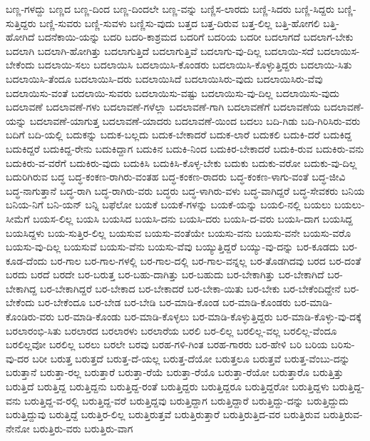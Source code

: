 {ಬಣ್ಣ-ಗಳದ್ದು
ಬಣ್ಣದ
ಬಣ್ಣ-ದಿಂದ
ಬಣ್ಣ-ದಿಂದಲೇ
ಬಣ್ಣ-ವನ್ನು
ಬಣ್ಣಿಸ-ಲಾರದು
ಬಣ್ಣಿ-ಸಿದರು
ಬಣ್ಣಿ-ಸಿದ್ದರು
ಬಣ್ಣಿ-ಸುತ್ತಿದ್ದರು
ಬಣ್ಣಿ-ಸುವರು
ಬಣ್ಣಿ-ಸುವಳು
ಬಣ್ಣಿಸು-ವುದು
ಬತ್ತದ
ಬತ್ತ-ದಿರುವ
ಬತ್ತ-ಲಿಲ್ಲ
ಬತ್ತಿ-ಹೋಗಲಿ
ಬತ್ತಿ-ಹೋಗಿದೆ
ಬದನೆಕಾಯಿ-ಯನ್ನು
ಬದರಿ
ಬದರಿ-ಕಾಶ್ರಮದ
ಬದರಿಗೆ
ಬದರಿಯ
ಬದರೀ
ಬದಲಾಗದೆ
ಬದಲಾಗ-ಬೇಕು
ಬದಲಾಗಿ
ಬದಲಾಗಿ-ಹೋಗಿತ್ತು
ಬದಲಾಗುತ್ತಿದೆ
ಬದಲಾಗುತ್ತಿವೆ
ಬದಲಾಗು-ವು-ದಿಲ್ಲ
ಬದಲಾಯಿ-ಸದೆ
ಬದಲಾಯಿಸ-ಬೇಕೆಂದು
ಬದಲಾಯಿ-ಸಲು
ಬದಲಾಯಿಸಿ
ಬದಲಾಯಿಸಿ-ಕೊಂಡರು
ಬದಲಾಯಿಸಿ-ಕೊಳ್ಳುತ್ತಿದ್ದರು
ಬದಲಾಯಿ-ಸಿತು
ಬದಲಾಯಿಸಿ-ತೆಂದೂ
ಬದಲಾಯಿಸಿ-ದರು
ಬದಲಾಯಿಸಿದೆ
ಬದಲಾಯಿಸಿರು-ವುದು
ಬದಲಾಯಿಸಿರು-ವೆವು
ಬದಲಾಯಿಸು-ವಂತೆ
ಬದಲಾಯಿ-ಸುವರು
ಬದಲಾಯಿಸು-ವಷ್ಟು
ಬದಲಾಯಿಸು-ವು-ದಿಲ್ಲ
ಬದಲಾಯಿಸು-ವುದು
ಬದಲಾವಣೆ
ಬದಲಾವಣೆ-ಗಳು
ಬದಲಾವಣೆ-ಗಳೆಲ್ಲಾ
ಬದಲಾವಣೆ-ಗಾಗಿ
ಬದಲಾವಣೆಗೆ
ಬದಲಾವಣೆಯ
ಬದಲಾವಣೆ-ಯನ್ನು
ಬದಲಾವಣೆ-ಯಾಗುತ್ತ
ಬದಲಾವಣೆ-ಯಾದರು
ಬದಲಾವಣೆ-ಯಿಂದ
ಬದಲು
ಬದಿ-ಗಿಡು
ಬದಿ-ಗಿರಿಸಿರು-ವರು
ಬದಿಗೆ
ಬದಿ-ಯಲ್ಲಿ
ಬದುಕನ್ನು
ಬದುಕ-ಬಲ್ಲದು
ಬದುಕ-ಬೇಕಾದರೆ
ಬದುಕ-ಲಾರೆ
ಬದುಕಲಿ
ಬದುಕಿ-ದರೆ
ಬದುಕಿದ್ದ
ಬದುಕಿದ್ದರೆ
ಬದುಕಿದ್ದ-ರೇನು
ಬದುಕಿದ್ದಾಗ
ಬದುಕಿನ
ಬದುಕಿ-ನಿಂದ
ಬದುಕಿರ-ಬೇಕಾದರೆ
ಬದುಕಿ-ರುವ
ಬದುಕಿರು-ವನು
ಬದುಕಿರು-ವ-ವರೆಗೆ
ಬದುಕಿರು-ವುದು
ಬದುಕಿಸಿ
ಬದುಕಿಸಿ-ಕೊಳ್ಳ-ಬೇಕು
ಬದುಕು
ಬದುಕು-ವರೋ
ಬದುಕು-ವು-ದಿಲ್ಲ
ಬದುರಿಗಿರುವ
ಬದ್ಧ
ಬದ್ಧ-ಕಂಕಣ-ರಾಗಿರು-ವಂತಹ
ಬದ್ಧ-ಕಂಕಣ-ರಾದರು
ಬದ್ಧ-ಕಂಕಣ-ಳಾಗು-ವಂತೆ
ಬದ್ಧ-ಜೀವಿ
ಬದ್ಧ-ನಾಗುತ್ತಾನೆ
ಬದ್ಧ-ರಾಗಿ
ಬದ್ಧ-ರಾಗಿರು-ವರು
ಬದ್ಧರು
ಬದ್ಧ-ಳಾಗಿರು-ವಳು
ಬದ್ಧ-ವಾಗಿದ್ದರೆ
ಬದ್ಧ-ಸೇವಕರು
ಬನಿಯ
ಬನಿಯ-ನಿಗೆ
ಬನಿ-ಯನ್
ಬನ್ನಿ
ಬಫೆಲೋ
ಬಯಕೆ
ಬಯಕೆ-ಗಳನ್ನು
ಬಯಕೆ-ಯನ್ನು
ಬಯಲಿ-ನಲ್ಲಿ
ಬಯಲು
ಬಯಲು-ಸೀಮೆಗೆ
ಬಯಸ-ಲಿಲ್ಲ
ಬಯಸಿ
ಬಯಸಿದ
ಬಯಸಿ-ದನು
ಬಯಸಿ-ದರು
ಬಯಸಿ-ದ-ವರು
ಬಯಸಿ-ದಾಗ
ಬಯಸಿದ್ದ
ಬಯಸಿದ್ದಳು
ಬಯ-ಸುತ್ತಿರ-ಲಿಲ್ಲ
ಬಯಸುವ
ಬಯಸು-ವಂತೆಯೇ
ಬಯಸು-ವನು
ಬಯಸು-ವನೇ
ಬಯಸು-ವರೊ
ಬಯಸು-ವು-ದಿಲ್ಲ
ಬಯಸುವೆ
ಬಯಸು-ವೆನು
ಬಯಸು-ವೆವು
ಬಯ್ಯುತ್ತಿದ್ದರೆ
ಬಯ್ಯು-ವು-ದನ್ನು
ಬರ-ಕೂಡದು
ಬರ-ಕೂಡ-ದೆಂದು
ಬರ-ಗಾಲ
ಬರ-ಗಾಲ-ಗಳಲ್ಲಿ
ಬರ-ಗಾಲ-ದಲ್ಲಿ
ಬರ-ಗಾಲ-ವನ್ನಲ್ಲ
ಬರ-ತೊಡಗಿದವು
ಬರದ
ಬರ-ದಂತೆ
ಬರದು
ಬರದೆ
ಬರದೇ
ಬರ-ಬರುತ್ತ
ಬರ-ಬಹು-ದಾಗಿತ್ತು
ಬರ-ಬಹುದು
ಬರ-ಬೇಕಾಗಿತ್ತು
ಬರ-ಬೇಕಾಗಿದೆ
ಬರ-ಬೇಕಾಗಿದ್ದ
ಬರ-ಬೇಕಾಗಿದ್ದರೆ
ಬರ-ಬೇಕಾದ
ಬರ-ಬೇಕಾದರೆ
ಬರ-ಬೇಕಾ-ಯಿತು
ಬರ-ಬೇಕು
ಬರ-ಬೇಕೆಂದಿದ್ದೇನೆ
ಬರ-ಬೇಕೆಂದು
ಬರ-ಬೇಕೆಂದೂ
ಬರ-ಬೇಡ
ಬರ-ಬೇಡಿ
ಬರ-ಮಾಡಿ-ಕೊಂಡ
ಬರ-ಮಾಡಿ-ಕೊಂಡರು
ಬರ-ಮಾಡಿ-ಕೊಂಡಿರು-ವರು
ಬರ-ಮಾಡಿ-ಕೊಂಡು
ಬರ-ಮಾಡಿ-ಕೊಳ್ಳಲು
ಬರ-ಮಾಡಿ-ಕೊಳ್ಳುತ್ತಿದ್ದರು
ಬರ-ಮಾಡಿ-ಕೊಳ್ಳು-ವು-ದಕ್ಕೆ
ಬರಲಾರಂಭಿ-ಸಿತು
ಬರಲಾರದ
ಬರಲಾರಳು
ಬರಲಾರೆಯ
ಬರಲಿ
ಬರ-ಲಿಲ್ಲ
ಬರಲಿಲ್ಲ-ವಲ್ಲ
ಬರಲಿಲ್ಲ-ವೆಂದೂ
ಬರಲಿಲ್ಲವೋ
ಬರಲಿಲ್ಲ
ಬರಲು
ಬರಲೇ
ಬರವು
ಬರಹ-ಗಳಿ-ಗಿಂತ
ಬರಹ-ಗಾರರು
ಬರ-ಹೇಳಿ
ಬರಿ
ಬರಿಯ
ಬರಿಸು-ವು-ದರ
ಬರೀ
ಬರುತ್ತ
ಬರುತ್ತದೆ
ಬರುತ್ತ-ದೆ-ಯಲ್ಲ
ಬರುತ್ತ-ದೆಯೋ
ಬರುತ್ತಲೂ
ಬರುತ್ತವೆ
ಬರುತ್ತ-ವೆಂಬು-ದನ್ನು
ಬರುತ್ತಾನೆ
ಬರುತ್ತಾ-ರಲ್ಲ
ಬರುತ್ತಾರೆ
ಬರುತ್ತಾ-ರೆಯೆ
ಬರುತ್ತಾ-ರೆಯೊ
ಬರುತ್ತಾ-ರೆಯೋ
ಬರುತ್ತಾರೊ
ಬರುತ್ತಿತ್ತು
ಬರುತ್ತಿದೆ
ಬರುತ್ತಿದ್ದ
ಬರುತ್ತಿದ್ದನು
ಬರುತ್ತಿದ್ದ-ರಂತೆ
ಬರುತ್ತಿದ್ದರು
ಬರುತ್ತಿದ್ದರೂ
ಬರುತ್ತಿದ್ದರೋ
ಬರುತ್ತಿದ್ದಳು
ಬರುತ್ತಿದ್ದ-ವನು
ಬರುತ್ತಿದ್ದ-ವ-ರಲ್ಲಿ
ಬರುತ್ತಿದ್ದ-ವರೆ
ಬರುತ್ತಿದ್ದವು
ಬರುತ್ತಿದ್ದಾಗ
ಬರುತ್ತಿದ್ದಾರೆ
ಬರುತ್ತಿದ್ದು-ದನ್ನು
ಬರುತ್ತಿದ್ದುದು
ಬರುತ್ತಿದ್ದುವು
ಬರುತ್ತಿದ್ದೆ
ಬರುತ್ತಿರ-ಲಿಲ್ಲ
ಬರುತ್ತಿರುತ್ತವೆ
ಬರುತ್ತಿರುತ್ತಾರೆ
ಬರುತ್ತಿರುತ್ತಿದ-ವರ
ಬರುತ್ತಿರುವ
ಬರುತ್ತಿರುವ-ನೇನೋ
ಬರುತ್ತಿರು-ವರು
ಬರುತ್ತಿರು-ವಾಗ
}
